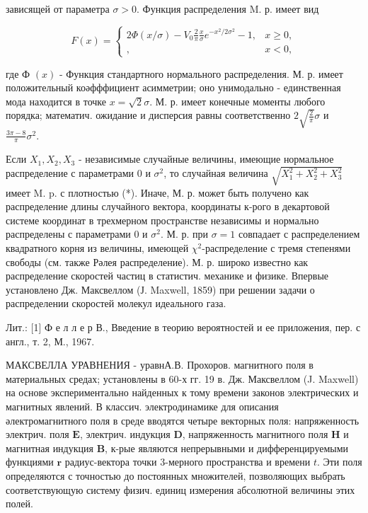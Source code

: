\documentclass[10pt]{article}
\begin{document}
зависящей от параметра $\sigma>0$. Функция распределения M. р. имеет вид



\[

F(x)=\left\{\begin{aligned}

2 \Phi(x / \sigma)-V_{0} \frac{2}{\pi} \frac{x}{\sigma} e^{-x^{2} / 2 \sigma^{2}}-1, & x \geqslant 0, \\

, & x<0,

\end{aligned}\right.

\]



где Ф $(x)$ - Функция стандартного нормального распределения. М. р. имеет положительный коәфффициент асимметрии; оно унимодально - единственная мода находится в точке $x=\sqrt{2} \sigma$. М. р. имеет конечные моменты любого порядка; математич. ожидание и дисперсия равны соответственно $2 \sqrt{\frac{2}{\pi}} \sigma$ и $\frac{3 \pi-8}{\pi} \sigma^{2}$.



Если $X_{1}, X_{2}, X_{3}$ - независимые случайные величины, имеющие нормальное распределение с параметрами 0 и $\sigma^{2}$, то случайная величина $\sqrt{X_{1}^{2}+X_{2}^{2}+X_{3}^{2}}$ имеет M. p. с плотностью (*). Иначе, М. р. может быть получено как распределение длины случайного вектора, координаты к-рого в декартовой системе координат в трехмерном пространстве независимы и нормально распределены с параметрами 0 и $\sigma^{2}$. М. р. при $\sigma=1$ совпадает с распределением квадратного корня из величины, имеющей $\chi^{2}$-распределение с тремя степенями свободы (см. также Рәлея распределение). М. р. широко известно как распределение скоростей частиц в статистич. механике и физике. Впервые установлено Дж. Максвеллом (Ј. Maxwell, 1859) при решении задачи о распределении скоростей молекул идеального газа.



Лит.: [1] Ф е л л е р В., Введение в теорию вероятностей и ее приложения, пер. с англ., т. 2, М., 1967.



МАКСВЕЛЛА УРАВНЕНИЯ - уравнА.В. Прохоров. магнитного поля в материальных средах; установлены в 60-х гг. 19 в. Дж. Максвеллом (J. Maxwell) на основе экспериментально найденных к тому времени законов электрических и магнитных явлений. В классич. электродинамике для описания әлектромагнитного поля в среде вводятся четыре векторных поля: напряженность электрич. поля $\boldsymbol{E}$, электрич. индукция $\boldsymbol{D}$, напряженность магнитного поля $\boldsymbol{H}$ и магнитная индукция $\boldsymbol{B}$, к-рые являются непрерывными и дифференцируемыми функциями $\boldsymbol{r}$ радиус-вектора точки 3-мерного пространства и времени $t$. Эти поля определяются с точностью до постоянных множителей, позволяющих выбрать соответствующую систему физич. единиц измерения абсолютной величины этих полей.
\end{document}
